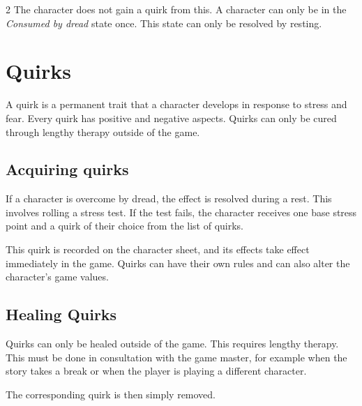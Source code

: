 \begin{multicols}{2}
The character does not gain a quirk from this. A character can only be in the \textit{Consumed by dread} state once. This state can only be resolved by resting.

\section{Quirks}

A quirk is a permanent trait that a character develops in response to stress and fear. Every quirk has positive and negative aspects. Quirks can only be cured through lengthy therapy outside of the game.

\subsection{Acquiring quirks}

If a character is overcome by dread, the effect is resolved during a rest. This involves rolling a stress test. If the test fails, the character receives one base stress point and a quirk of their choice from the list of quirks.

This quirk is recorded on the character sheet, and its effects take effect immediately in the game. Quirks can have their own rules and can also alter the character's game values.

\subsection{Healing Quirks}

Quirks can only be healed outside of the game. This requires lengthy therapy. This must be done in consultation with the game master, for example when the story takes a break or when the player is playing a different character.

The corresponding quirk is then simply removed.
\end{multicols}
